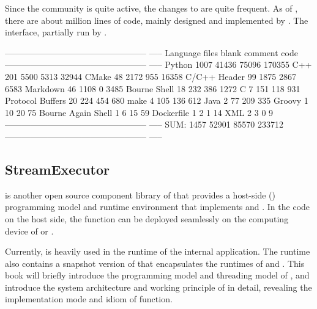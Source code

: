 \begin{content}
Since the \tf{} community is quite active, the changes to  are quite frequent. As of , there are about  million lines of code, mainly designed and implemented by . The interface, partially run by .

\begin{leftbar}
\begin{python}[caption={ContribCode Statistics}]
-------------------------------------------------- -----
Language            files     blank   comment      code
-------------------------------------------------- -----
Python               1007     41436     75096    170355
C++                   201      5500      5313     32944
CMake                  48      2172       955     16358
C/C++ Header           99      1875      2867      6583
Markdown 46 1108 0 3485
Bourne Shell           18       232       386      1272
C                       7       151       118       931
Protocol Buffers       20       224       454       680
make                    4       105       136       612
Java                    2        77       209       335
Groovy                  1        10        20        75
Bourne Again Shell      1         6        15        59
Dockerfile              1         2         1        14
XML                     2         3         0         9
-------------------------------------------------- -----
SUM:                 1457     52901     85570    233712
-------------------------------------------------- -----
\end{python}
\end{leftbar}

\subsection{StreamExecutor}

 is another open source component library of  that provides a host-side () programming model and runtime environment that implements  and . In the code on the host side, the  function can be deployed seamlessly on the computing device of  or .

Currently,  is heavily used in the runtime of the  internal application. The \tf{} runtime also contains a snapshot version of  that encapsulates the runtimes of  and . This book will briefly introduce the programming model and threading model of , and introduce the system architecture and working principle of  in detail, revealing the implementation mode and idiom of  function.


\end{content}
